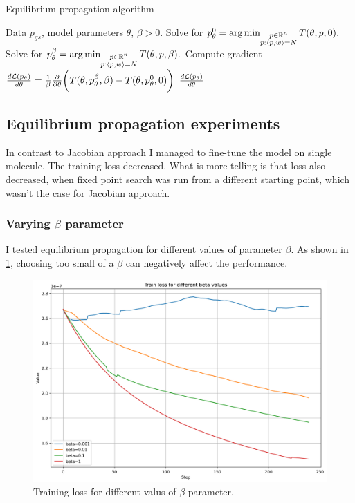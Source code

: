 \documentclass[a4paper,10.5pt]{report}
\begin{document}
\begin{algorithm}[H]
\caption{Equilibrium propagation algorithm}
\begin{algorithmic}[1]
\Require Data $p_{gs}$, model parameters $\theta$, $\beta>0$.
\State  Solve for $p_\theta^0  = \operatorname*{arg\,min}_{\substack{p \in \mathbb{R}^n \\ p: \langle p, w \rangle=N }} T(\theta, p, 0).$
\State Solve for $p_\theta^\beta  = \operatorname*{arg\,min}_{\substack{p \in \mathbb{R}^n \\ p: \langle p, w \rangle=N }} T(\theta, p, \beta).$
\State Compute gradient $\frac{d\mathcal{L}(p_\theta)}{d \theta} = \frac{1}{\beta} \frac{\partial }{\partial \theta} \bigg(T(\theta, p_\theta^\beta,\beta) - T(\theta, p_\theta^0, 0)\bigg)$
\State \Return $\frac{d\mathcal{L}(p_\theta)}{d \theta}$
\end{algorithmic}
\end{algorithm}


\subsection{Equilibrium propagation experiments}
In contrast to Jacobian approach I managed to fine-tune the model on single molecule.
The training loss decreased. What is more telling is that loss also decreased, when fixed point search was run from a different starting point, which wasn't the case for Jacobian approach.
\subsubsection{Varying $\beta$ parameter}
I tested equilibrium propagation for different values of parameter $\beta$.
As shown in \ref{fig:betas}, choosing too small of a $\beta$ can negatively affect the performance.
\begin{figure}[H]
 \centering
 \includegraphics[scale=0.5]{images/train_loss_betas.png}
 \caption{Training loss for different valus of $\beta$ parameter.}
 \label{fig:betas}
\end{figure}
\end{document}
